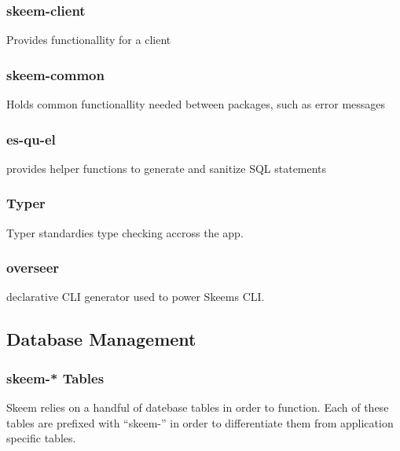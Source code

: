 \documentclass[
  12pt,
]{article}
\begin{document}
\hypertarget{skeem-client}{%
\subsubsection{skeem-client}\label{skeem-client}}

Provides functionallity for a client

\hypertarget{skeem-common}{%
\subsubsection{skeem-common}\label{skeem-common}}

Holds common functionallity needed between packages, such as error
messages

\hypertarget{es-qu-el}{%
\subsubsection{es-qu-el}\label{es-qu-el}}

provides helper functions to generate and sanitize SQL statements

\hypertarget{typer}{%
\subsubsection{Typer}\label{typer}}

Typer standardies type checking accross the app.

\hypertarget{overseer}{%
\subsubsection{overseer}\label{overseer}}

declarative CLI generator used to power Skeems CLI.

\hypertarget{database-management}{%
\subsection{Database Management}\label{database-management}}

\hypertarget{skeem--tables}{%
\subsubsection{skeem-* Tables}\label{skeem--tables}}

Skeem relies on a handful of datebase tables in order to function. Each
of these tables are prefixed with ``skeem-'' in order to differentiate
them from application specific tables.
\end{document}
